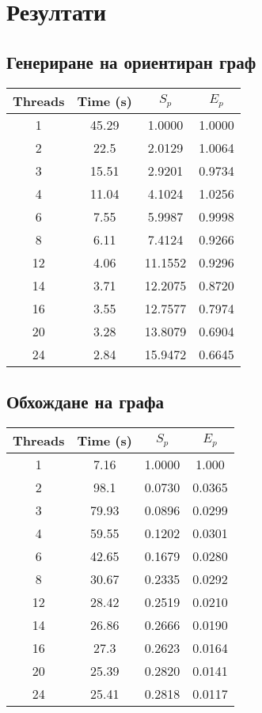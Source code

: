 \section{Резултати}

\subsection*{Генериране на ориентиран граф}

\begin{tabular}{|c|c|c|c|}
\hline
Threads & Time (s) & $S_p$ & $E_p$\\
\hline \hline
1	& 45.29  & 1.0000  & 1.0000 \\
\hline
2	& 22.5   & 2.0129  & 1.0064 \\
\hline
3	& 15.51  & 2.9201  & 0.9734 \\
\hline
4	& 11.04  & 4.1024  & 1.0256 \\
\hline
6	& 7.55   & 5.9987  & 0.9998 \\
\hline
8	& 6.11   & 7.4124  & 0.9266 \\
\hline
12	& 4.06   & 11.1552 & 0.9296 \\
\hline
14	& 3.71   & 12.2075 & 0.8720 \\
\hline
16	& 3.55   & 12.7577 & 0.7974 \\
\hline
20	& 3.28   & 13.8079 & 0.6904 \\
\hline
24	& 2.84   & 15.9472 & 0.6645 \\
\hline
\end{tabular}

\subsection*{Обхождане на графа}

\begin{tabular}{|c|c|c|c|}
\hline
Threads & Time (s) & $S_p$ & $E_p$\\
\hline \hline
1	& 7.16   & 1.0000 & 1.000 \\
\hline
2	& 98.1   & 0.0730 & 0.0365 \\
\hline
3	& 79.93  & 0.0896 & 0.0299 \\
\hline
4	& 59.55  & 0.1202 & 0.0301 \\
\hline
6	& 42.65  & 0.1679 & 0.0280 \\
\hline
8	& 30.67  & 0.2335 & 0.0292 \\
\hline
12	& 28.42  & 0.2519 & 0.0210 \\
\hline
14	& 26.86  & 0.2666 & 0.0190 \\
\hline
16	& 27.3   & 0.2623 & 0.0164 \\
\hline
20	& 25.39  & 0.2820 & 0.0141 \\
\hline
24	& 25.41  & 0.2818 & 0.0117 \\
\hline


\end{tabular}
